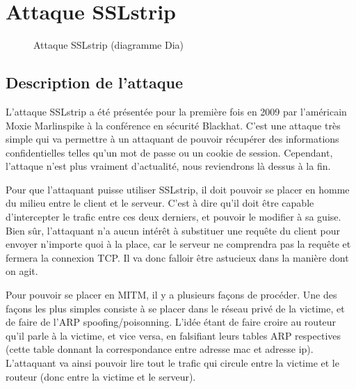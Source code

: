 \chapter{Attaque SSLstrip}

\label{sec:sslstrip}

\begin{figure}[H]
  \caption{Attaque SSLstrip (diagramme Dia)}
\end{figure}

\section{Description de l'attaque}

L'attaque SSLstrip a été présentée pour la première fois en 2009 par l'américain Moxie Marlinspike à la conférence en sécurité Blackhat. C'est une attaque très simple qui va permettre à un attaquant de pouvoir récupérer des informations confidentielles telles qu'un mot de passe ou un cookie de session. Cependant, l'attaque n'est plus vraiment d'actualité, nous reviendrons là dessus à la fin.

Pour que l'attaquant puisse utiliser SSLstrip, il doit pouvoir se placer en homme du milieu entre le client et le serveur. C'est à dire qu'il doit être capable d'intercepter le trafic entre ces deux derniers, et pouvoir le modifier à sa guise. Bien sûr, l'attaquant n'a aucun intérêt à substituer une requête du client pour envoyer n'importe quoi à la place, car le serveur ne comprendra pas la requête et fermera la connexion TCP. Il va donc falloir être astucieux dans la manière dont on agit.

Pour pouvoir se placer en MITM, il y a plusieurs façons de procéder. Une des façons les plus simples consiste à se placer dans le réseau privé de la victime, et de faire de l'ARP spoofing/poisonning. L'idée étant de faire croire au routeur qu'il parle à la victime, et vice versa, en falsifiant leurs tables ARP respectives (cette table donnant la correspondance entre adresse mac et adresse ip). L'attaquant va ainsi pouvoir lire tout le trafic qui circule entre la victime et le routeur (donc entre la victime et le serveur).

